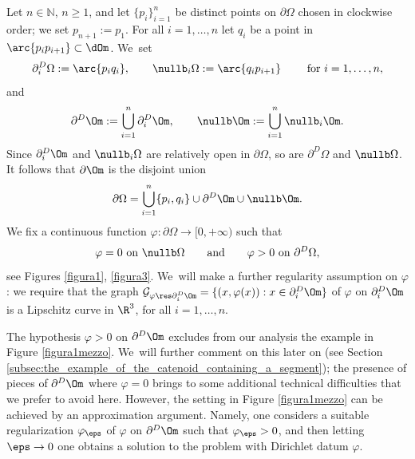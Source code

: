 Let $n\in\mathbb N$, $n \geq 1$, and let $\{p_i\}_{i=1}^n$ be
distinct points on $\partial\Omega$ chosen in clockwise order;
we set $p_{n+1} := p_1$.
For all $i=1,\dots,n$ let $q_i$ be a point in
$\arc{p_ip_{i+1}}
\subset \dOm$. We~set
\begin{align}
\partial_i^D\Omega:=\arc{p_iq_i},\qquad\nullb_i\Omega:=\arc{q_ip_{i+1}}\qquad \text{ for }i=1,\dots,n,
\end{align}
and
\begin{equation}
\partial^D\Om:=\bigcup_{i=1}^n\partial_i^D\Om,\qquad \nullb\Om:=\bigcup_{i=1}^n\nullb_i\Om.
\end{equation}
Since $\partial_i^D\Om$ and $\nullb_i\Omega$
are relatively open in $\partial \Omega$,
so are $\partial^D\Omega$ and $\nullb\Omega$. It follows that $\partial
\Om$ is the disjoint union
\[
\partial\Omega=\bigcup_{i=1}^n\{p_i,q_i\}\cup \partial^D\Om \cup
\nullb\Om.
\]
We fix a continuous function
$\varphi:\partial \Omega\to [0,+\infty)$ such that
\begin{equation}\label{boundary-value}
\varphi = 0 \text{ on } \nullb\Omega
\qquad \text{and} \qquad
\varphi >0 \text{ on }\partial^D\Omega,
\end{equation}
see Figures \ref{figura1}, \ref{figura3}. We~will make a further regularity assumption on $\varphi$: we require that the graph $\mathcal G_{\varphi\res\partial^D_i\Om}=\{(x,\varphi(x)):x\in \partial^D_i\Om\}$ of $\varphi$ on $\partial^D_i\Om$ is a Lipschitz curve in $\R^3$, for all $i=1,\dots,n$.
\begin{Remark}\rm
The hypothesis $\varphi>0$ on $\partial^D\Om$ excludes from our analysis
the example in Figure \ref{figura1mezzo}. We~will further comment on this later on (see Section \ref{subsec:the_example_of_the_catenoid_containing_a_segment}); the presence of pieces of $\partial^D\Om$ where $\varphi=0$ brings to some additional technical difficulties that we prefer to avoid here. However, the setting in Figure \ref{figura1mezzo} can be
achieved by an approximation argument. Namely, one considers a suitable regularization $\varphi_\eps$ of $\varphi$ on $\partial^D\Om$ such that $\varphi_\eps>0$, and then letting $\eps\to0$ one obtains a solution to the problem with Dirichlet datum $\varphi$.
\end{Remark}

